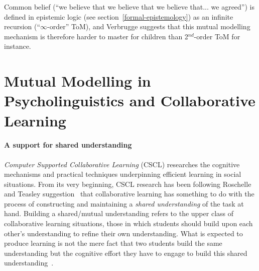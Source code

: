 \documentclass{sig-alternate}
\begin{document}
Common belief (``we believe that we believe that we believe that... we agreed'') is
defined in epistemic logic (see section~\ref{formal-epistemology}) as an infinite
recursion (``$\infty$-order'' ToM), and Verbrugge suggests that this mutual
modelling mechanism is therefore harder to master for children than 2$^{nd}$-order ToM for
instance.
%
%
%
%
%

\section{Mutual Modelling in Psycholinguistics and Collaborative Learning}

\paragraph{A support for shared understanding}

\emph{Computer Supported Collaborative Learning} (CSCL) researches the cognitive
mechanisms and practical techniques underpinning efficient learning in social
situations. From its very beginning, CSCL research has been following
Roschelle and Teasley suggestion~\cite{roschelle1995construction} that
collaborative learning has something to do with the process of constructing and
maintaining a \emph{shared understanding} of the task at hand. Building a shared/mutual
understanding refers to the upper class of collaborative learning situations,
those in which students should build upon each other's understanding to refine
their own understanding.  What is expected to produce learning is not the mere
fact that two students build the same understanding but the cognitive effort
they have to engage to build this shared
understanding~\cite{schwartz1995emergence}.
\end{document}
